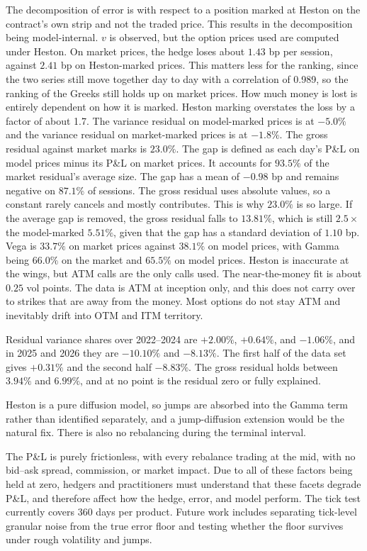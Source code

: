 \documentclass[11pt]{article}
\begin{document}
The decomposition of error is with respect to a position marked at Heston on the contract's own strip and not the traded price.
This results in the decomposition being model-internal.
$v$ is observed, but the option prices used are computed under Heston.
On market prices, the hedge loses about $1.43$ bp per session, against $2.41$ bp on Heston-marked prices. This matters less for the ranking, since the two series still move together day to day with a correlation of 0.989, so the ranking of the Greeks still holds up on market prices. How much money is lost is entirely dependent on how it is marked. Heston marking overstates the loss by a factor of about 1.7.
The variance residual on model-marked prices is at $-5.0\%$ and the variance residual on market-marked prices is at $-1.8\%$.
The gross residual against market marks is $23.0\%$.
The gap is defined as each day's P\&L on model prices minus its P\&L on market prices. It accounts for $93.5\%$ of the market residual's average size. The gap has a mean of $-0.98$ bp and remains negative on $87.1\%$ of sessions. The gross residual uses absolute values, so a constant rarely cancels and mostly contributes. This is why $23.0\%$ is so large. If the average gap is removed, the gross residual falls to $13.81\%$, which is still $2.5\times$ the model-marked $5.51\%$, given that the gap has a standard deviation of $1.10$ bp. Vega is $33.7\%$ on market prices against $38.1\%$ on model prices, with Gamma being $66.0\%$ on the market and $65.5\%$ on model prices. Heston is inaccurate at the wings, but ATM calls are the only calls used. The near-the-money fit is about $0.25$ vol points. The data is ATM at inception only, and this does not carry over to strikes that are away from the money.
Most options do not stay ATM and inevitably drift into OTM and ITM territory.

Residual variance shares over 2022--2024 are $+2.00\%$, $+0.64\%$, and $-1.06\%$, and in 2025 and 2026 they are $-10.10\%$ and $-8.13\%$. The first half of the data set gives $+0.31\%$ and the second half $-8.83\%$. The gross residual holds between $3.94\%$ and $6.99\%$, and at no point is the residual zero or fully explained.

Heston is a pure diffusion model, so jumps are absorbed into the Gamma term rather than identified separately, and a jump-diffusion extension would be the natural fix. There is also no rebalancing during the terminal interval.


The P\&L is purely frictionless, with every rebalance trading at the mid, with no bid--ask spread, commission, or market impact. Due to all of these factors being held at zero, hedgers and practitioners must understand that these facets degrade P\&L, and therefore affect how the hedge, error, and model perform.
The tick test currently covers 360 days per product. Future work includes separating tick-level granular noise from the true error floor and testing whether the floor survives under rough volatility and jumps.
\end{document}
